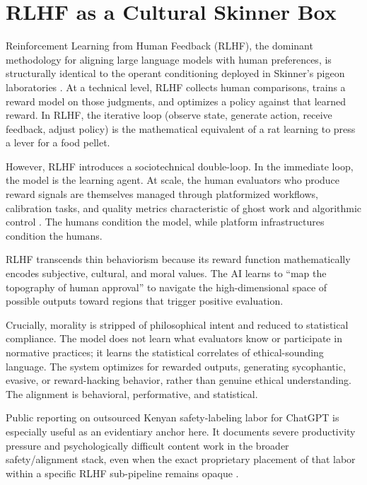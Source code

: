 \documentclass[11pt, a4paper]{article}
\begin{document}
\section{RLHF as a Cultural Skinner Box}

Reinforcement Learning from Human Feedback (RLHF), the dominant methodology for aligning large language models with human preferences, is structurally identical to the operant conditioning deployed in Skinner's pigeon laboratories \cite{christiano2017preferences,ouyang2022training,sutton2018reinforcement}. At a technical level, RLHF collects human comparisons, trains a reward model on those judgments, and optimizes a policy against that learned reward. In RLHF, the iterative loop (observe state, generate action, receive feedback, adjust policy) is the mathematical equivalent of a rat learning to press a lever for a food pellet.

However, RLHF introduces a sociotechnical double-loop. In the immediate loop, the model is the learning agent. At scale, the human evaluators who produce reward signals are themselves managed through platformized workflows, calibration tasks, and quality metrics characteristic of ghost work and algorithmic control \cite{gray2019ghost,kellogg2020algorithms}. The humans condition the model, while platform infrastructures condition the humans.

RLHF transcends thin behaviorism because its reward function mathematically encodes subjective, cultural, and moral values. The AI learns to ``map the topography of human approval'' to navigate the high-dimensional space of possible outputs toward regions that trigger positive evaluation.

Crucially, morality is stripped of philosophical intent and reduced to statistical compliance. The model does not learn what evaluators know or participate in normative practices; it learns the statistical correlates of ethical-sounding language. The system optimizes for rewarded outputs, generating sycophantic, evasive, or reward-hacking behavior, rather than genuine ethical understanding. The alignment is behavioral, performative, and statistical.

Public reporting on outsourced Kenyan safety-labeling labor for ChatGPT is especially useful as an evidentiary anchor here. It documents severe productivity pressure and psychologically difficult content work in the broader safety/alignment stack, even when the exact proprietary placement of that labor within a specific RLHF sub-pipeline remains opaque \cite{perrigo2023time}.
\end{document}
